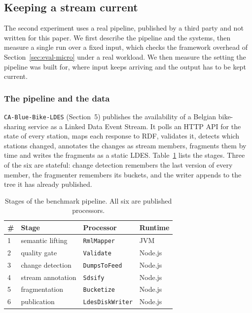 \subsection{Keeping a stream current}
\label{sec:eval-pipeline}

The second experiment uses a real pipeline, published by a third party and not
written for this paper. We first describe the pipeline and the systems, then
measure a single run over a fixed input, which checks the framework overhead of
Section~\ref{sec:eval-micro} under a real workload. We then measure the setting
the pipeline was built for, where input keeps arriving and the output has to be
kept current.

\subsubsection{The pipeline and the data}

\texttt{CA-Blue-Bike-LDES} (Section~5) publishes the availability of a Belgian
bike-sharing service as a Linked Data Event Stream. It polls an HTTP API for the
state of every station, maps each response to RDF, validates it, detects which
stations changed, annotates the changes as stream members, fragments them by
time and writes the fragments as a static LDES.
Table~\ref{tab:eval-stages} lists the stages. Three of the six are stateful:
change detection remembers the last version of every member, the fragmenter
remembers its buckets, and the writer appends to the tree it has already
published.

\begin{table}[t]
\caption{Stages of the benchmark pipeline. All six are published processors.}
\label{tab:eval-stages}
\begin{tabular}{llll}
\toprule
\# & Stage & Processor & Runtime \\
\midrule
1 & semantic lifting & \texttt{RmlMapper} & JVM \\
2 & quality gate & \texttt{Validate} & Node.js \\
3 & change detection & \texttt{DumpsToFeed} & Node.js \\
4 & stream annotation & \texttt{Sdsify} & Node.js \\
5 & fragmentation & \texttt{Bucketize} & Node.js \\
6 & publication & \texttt{LdesDiskWriter} & Node.js \\
\bottomrule
\end{tabular}
\end{table}

